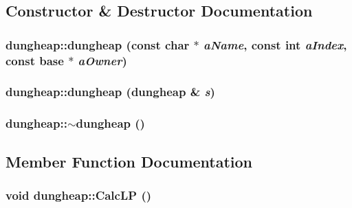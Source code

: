 \subsection{Constructor \& Destructor Documentation}
\hypertarget{classdungheap_afa14e95ebc5010c87c5436a1f8dee864}{
\subsubsection[{dungheap}]{\setlength{\rightskip}{0pt plus 5cm}dungheap::dungheap (const char $\ast$ {\em aName}, \/  const int {\em aIndex}, \/  const {\bf base} $\ast$ {\em aOwner})}}
\label{classdungheap_afa14e95ebc5010c87c5436a1f8dee864}
\hypertarget{classdungheap_ae85a443b5115bd4b0106dbd199812b7b}{
\subsubsection[{dungheap}]{\setlength{\rightskip}{0pt plus 5cm}dungheap::dungheap ({\bf dungheap} \& {\em s})}}
\label{classdungheap_ae85a443b5115bd4b0106dbd199812b7b}
\hypertarget{classdungheap_ab819ea784b8f0af38dce38b8697498d8}{
\subsubsection[{$\sim$dungheap}]{\setlength{\rightskip}{0pt plus 5cm}dungheap::$\sim$dungheap ()}}
\label{classdungheap_ab819ea784b8f0af38dce38b8697498d8}


\subsection{Member Function Documentation}
\hypertarget{classdungheap_af4b63f00620c98cefc7008b5bc6b2170}{
\subsubsection[{CalcLP}]{\setlength{\rightskip}{0pt plus 5cm}void dungheap::CalcLP ()}}
\label{classdungheap_af4b63f00620c98cefc7008b5bc6b2170}


